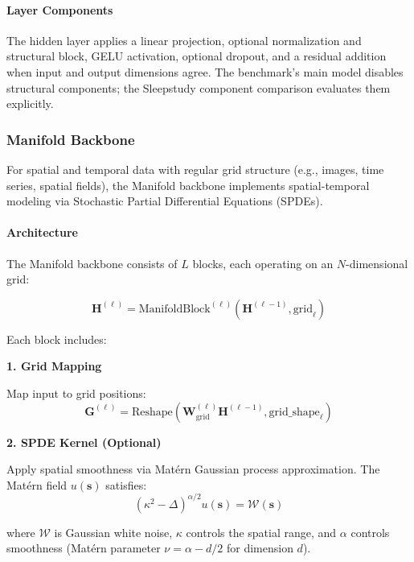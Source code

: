 \documentclass[12pt,a4paper]{article}
\begin{document}
\paragraph{Layer Components}
The hidden layer applies a linear projection, optional normalization and structural block, GELU activation, optional dropout, and a residual addition when input and output dimensions agree. The benchmark's main model disables structural components; the Sleepstudy component comparison evaluates them explicitly.

\subsubsection{Manifold Backbone}
\label{sec:manifold}

For spatial and temporal data with regular grid structure (e.g., images, time series, spatial fields), the Manifold backbone implements spatial-temporal modeling via Stochastic Partial Differential Equations (SPDEs).

\paragraph{Architecture}

The Manifold backbone consists of $L$ blocks, each operating on an $N$-dimensional grid:

\begin{equation}
    \mathbf{H}^{(\ell)} = \text{ManifoldBlock}^{(\ell)}(\mathbf{H}^{(\ell-1)}, \text{grid}_\ell)
\end{equation}

Each block includes:

\textbf{1. Grid Mapping}

Map input to grid positions:
\begin{equation}
    \mathbf{G}^{(\ell)} = \text{Reshape}(\mathbf{W}_{\text{grid}}^{(\ell)}\mathbf{H}^{(\ell-1)}, \text{grid\_shape}_\ell)
\end{equation}

\textbf{2. SPDE Kernel (Optional)}

Apply spatial smoothness via Mat\'ern Gaussian process approximation. The Mat\'ern field $u(\mathbf{s})$ satisfies:
\begin{equation}
    (\kappa^2 - \Delta)^{\alpha/2} u(\mathbf{s}) = \mathcal{W}(\mathbf{s})
\end{equation}

where $\mathcal{W}$ is Gaussian white noise, $\kappa$ controls the spatial range, and $\alpha$ controls smoothness (Mat\'ern parameter $\nu = \alpha - d/2$ for dimension $d$).
\end{document}
